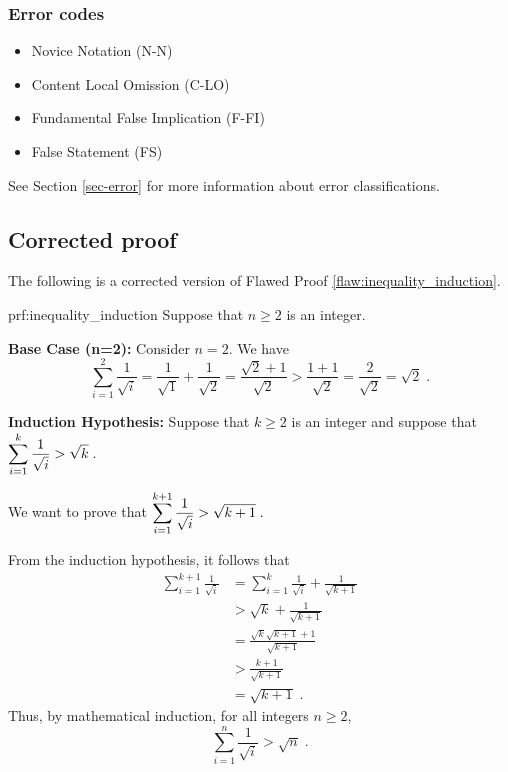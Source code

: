  
\subsubsection{Error codes}
\begin{itemize}
	\item 	Novice Notation (N-N)
	\item   Content Local Omission (C-LO)
	\item   Fundamental False Implication (F-FI) 
	\item   False Statement (FS)
\end{itemize}
See Section \ref{sec-error} for more information about error classifications.

\clearpage
\subsection{Corrected proof}

The following is a corrected version of Flawed Proof \ref{flaw:inequality_induction}. 

\begin{prf}{prf:inequality_induction} 
Suppose that $n \geq 2$ is an integer.

\noindent \textbf{Base Case (n=2):} Consider $n=2$.  We have
$$\sum_{i=1}^2 \frac{1}{\sqrt{i}} = \frac{1}{\sqrt{1}} + \frac{1}{\sqrt{2}} = \frac{\sqrt{2}+1}{\sqrt{2}} >  \frac{1 + 1}{\sqrt{2}} = \frac{2}{\sqrt{2}} = \sqrt{2}\;.$$ 

\noindent \textbf{Induction Hypothesis:} Suppose that $k \geq 2$ is an integer and suppose that 
$\displaystyle\sum_{i=1}^k \frac{1}{\sqrt{i}} > \sqrt{k}\;.$

\noindent We want to prove that 
$\displaystyle \sum_{i=1}^{k+1} \frac{1}{\sqrt{i}} > \sqrt{k+1}\;.$

\noindent From the induction hypothesis, it follows that 
\begin{align*}
    \sum_{i=1}^{k+1} \frac{1}{\sqrt{i}} &= \sum_{i=1}^{k} \frac{1}{\sqrt{i}} + \frac{1}{\sqrt{k+1}} \\
    &> \sqrt{k} + \frac{1}{\sqrt{k+1}} \\
    &= \frac{\sqrt{k}\sqrt{k+1}+1}{\sqrt{k+1}} \\
    &>\frac{k+1}{\sqrt{k+1}} \\
    &= \sqrt{k+1}\;.
\end{align*}
Thus, by mathematical induction, for all integers $n \geq 2,$
$$\sum_{i=1}^n \frac{1}{\sqrt{i}} > \sqrt{n}\;.$$
\end{prf}
